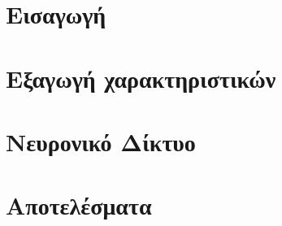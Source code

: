 \documentclass[12pt]{article}
\begin{document}
\maketitle \newpage
{}
\tableofcontents \newpage

\section{Εισαγωγή}


\section{Εξαγωγή χαρακτηριστικών}


\section{Νευρονικό Δίκτυο}


\section{Αποτελέσματα}


\newpage
\begin{english}
	
	
\end{english}
\end{document}
